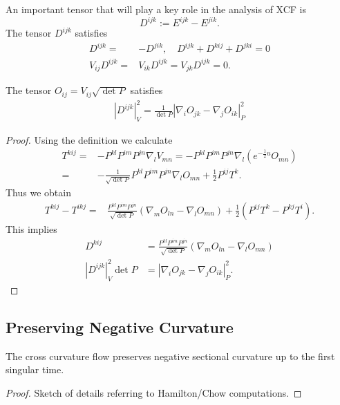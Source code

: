 \documentclass[a4paper, 12pt]{amsart}
\begin{document}
An important tensor that will play a key role in the analysis of XCF is
\[D^{ijk}:=E^{ijk}-E^{jik}.\]
The tensor $D^{ijk}$ satisfies
\begin{align}
D^{ijk}=&-D^{jik},\quad D^{ijk}+D^{kij}+D^{jki}=0\\
V_{ij}D^{ijk}=&V_{ik}D^{ijk}=V_{jk}D^{ijk}=0.
\end{align}

\begin{lemma}
\label{lem:cubicform_codazzi}

The tensor $O_{ij}=V_{ij}\sqrt{\det P}$ satisfies
\begin{align}
|D^{ijk}|_V^2=\frac{1}{\det P}|\nabla_iO_{jk}-\nabla_jO_{ik}|_P^2
\end{align}
\end{lemma}

\begin{proof}
Using the definition we calculate
\begin{align}
T^{kij}=&-P^{kl}P^{im}P^{jn}\nabla_l V_{mn}=-P^{kl}P^{im}P^{jn}\nabla_l (e^{-\frac{1}{2}u}O_{mn})\\
=&-\frac{1}{\sqrt{\det P}}P^{kl}P^{im}P^{jn}\nabla_l O_{mn}+\frac{1}{2}P^{ij}T^k.
\end{align}
Thus we obtain
\begin{align*}
T^{kij}-T^{ikj}=&\frac{P^{kl}P^{im}P^{jn}}{\sqrt{\det P}}\left(\nabla_m O_{ln}-\nabla_l O_{mn}\right)+\frac{1}{2}(P^{ij}T^k-P^{kj}T^i).
\end{align*}
This implies
\begin{align}
D^{kij}&=\frac{P^{kl}P^{im}P^{jn}}{\sqrt{\det P}}\left(\nabla_m O_{ln}-\nabla_l O_{mn}\right)\\
|D^{ijk}|_V^2\det P&=|\nabla_iO_{jk}-\nabla_jO_{ik}|_P^2.
\end{align}
\end{proof}

\subsection{Preserving Negative Curvature}
\label{subsec:xcf_preserving}

\begin{lemma}
The cross curvature flow preserves negative sectional curvature up to the first singular time.
\end{lemma}

\begin{proof}
{\color{red} Sketch of details referring to Hamilton/Chow computations.}
\end{proof}
\end{document}

